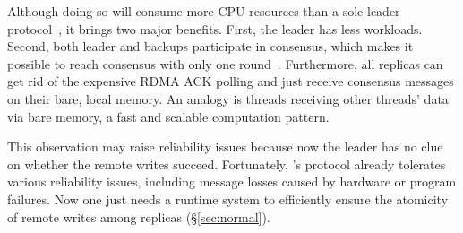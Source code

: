Although doing so will consume more CPU resources than a sole-leader 
protocol~\cite{dare:hpdc15}, it brings two major benefits. First, the leader 
has less workloads. Second, both leader and backups participate in consensus, 
which makes it possible to reach consensus with only one 
round~\cite{paxos:practical}. Furthermore, all replicas can get rid of 
the expensive RDMA ACK polling and just receive consensus messages on their 
bare, local memory. An analogy is threads receiving other threads' data via 
bare memory, a fast and scalable computation pattern.



This observation may raise reliability issues because now the leader has no 
clue on whether the remote writes succeed. Fortunately, \paxos's protocol 
already tolerates various reliability issues, including message losses caused by
hardware or program failures. Now one just needs a runtime system to 
efficiently ensure the atomicity of remote writes among replicas 
(\S\ref{sec:normal}).





